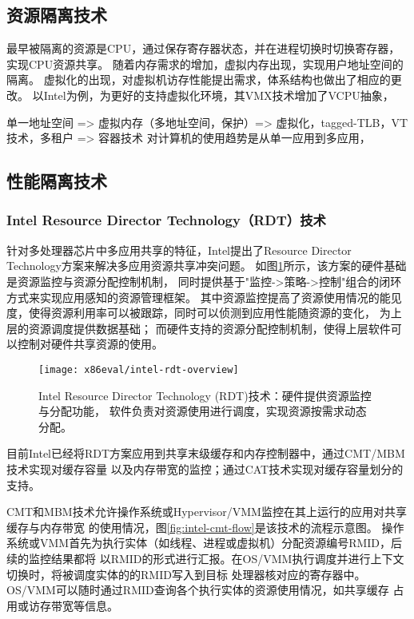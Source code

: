 \subsection{资源隔离技术}


最早被隔离的资源是CPU，通过保存寄存器状态，并在进程切换时切换寄存器，实现CPU资源共享。
随着内存需求的增加，虚拟内存出现，实现用户地址空间的隔离。
虚拟化的出现，对虚拟机访存性能提出需求，体系结构也做出了相应的更改。
以Intel为例，为更好的支持虚拟化环境，其VMX技术增加了VCPU抽象，

单一地址空间 => 虚拟内存（多地址空间，保护）=> 虚拟化，tagged-TLB，VT技术，多租户
                                            => 容器技术
对计算机的使用趋势是从单一应用到多应用，

\subsection{性能隔离技术}

\subsubsection*{Intel Resource Director Technology（RDT）技术}

针对多处理器芯片中多应用共享的特征，Intel提出了Resource Director Technology方案来解决多应用资源共享冲突问题。
如图\ref{fig:intel-rdt-overview}所示，该方案的硬件基础是资源监控与资源分配控制机制，
同时提供基于"监控->策略->控制"组合的闭环方式来实现应用感知的资源管理框架。
其中资源监控提高了资源使用情况的能见度，使得资源利用率可以被跟踪，同时可以侦测到应用性能随资源的变化，
为上层的资源调度提供数据基础；
而硬件支持的资源分配控制机制，使得上层软件可以控制对硬件共享资源的使用。

\begin{figure}[H]
  \centering
  \texttt{[image: x86eval/intel-rdt-overview]}
  \caption[Intel Resource Director Technology (RDT) 技术示意图]{
    Intel Resource Director Technology (RDT)技术：硬件提供资源监控与分配功能，
    软件负责对资源使用进行调度，实现资源按需求动态分配。}
  \label{fig:intel-rdt-overview}
\end{figure}

目前Intel已经将RDT方案应用到共享末级缓存和内存控制器中，通过CMT/MBM技术实现对缓存容量
以及内存带宽的监控；通过CAT技术实现对缓存容量划分的支持。

CMT和MBM技术允许操作系统或Hypervisor/VMM监控在其上运行的应用对共享缓存与内存带宽
的使用情况，图\ref{fig:intel-cmt-flow}是该技术的流程示意图。
操作系统或VMM首先为执行实体（如线程、进程或虚拟机）分配资源编号RMID，后续的监控结果都将
以RMID的形式进行汇报。在OS/VMM执行调度并进行上下文切换时，将被调度实体的的RMID写入到目标
处理器核对应的寄存器中。OS/VMM可以随时通过RMID查询各个执行实体的资源使用情况，如共享缓存
占用或访存带宽等信息。
 
